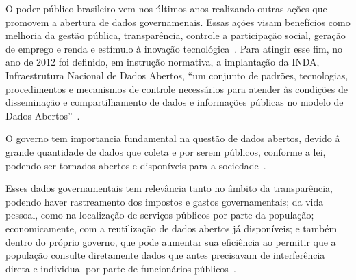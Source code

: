 O poder público brasileiro vem nos últimos anos realizando outras ações que promovem a abertura de dados governamenais. Essas ações visam benefícios como melhoria da gestão pública, transparência, controle a participação social, geração de emprego e renda e estímulo à inovação tecnológica~\cite{tcu}. Para atingir esse fim, no ano de 2012 foi definido, em instrução normativa, a implantação da INDA, Infraestrutura Nacional de Dados Abertos, \enquote{um conjunto de padrões, tecnologias, procedimentos e mecanismos de controle necessários para atender às condições de disseminação e compartilhamento de dados e informações públicas no modelo de Dados Abertos}~\cite{inda}.  

O governo tem importancia fundamental na questão de dados abertos, devido â grande quantidade de dados que coleta e por serem públicos, conforme a lei, podendo ser tornados abertos e disponíveis para a sociedade~\cite{openknowledge}.

Esses dados governamentais tem relevância tanto no âmbito da transparência, podendo haver rastreamento dos impostos e gastos governamentais; da vida pessoal, como na localização de serviços públicos por parte da população; economicamente, com a reutilização de dados abertos já disponíveis; e também dentro do próprio governo, que pode aumentar sua eficiência ao permitir que a população consulte diretamente dados que antes precisavam de interferência direta e individual por parte de funcionários públicos~\cite{openknowledge}.











